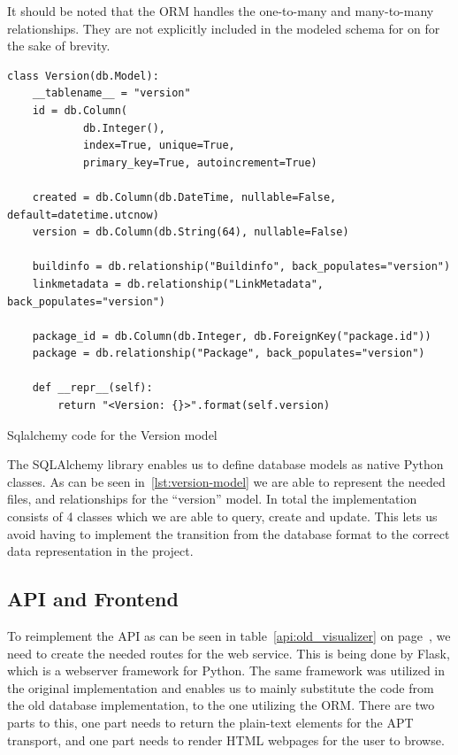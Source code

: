 \documentclass[../Main/thesis.tex]{subfiles}
\begin{document}
It should be noted that the ORM handles the one-to-many and many-to-many
relationships. They are not explicitly included in the modeled schema for on 
for the sake of brevity.

\begin{listing}[H]
\begin{verbatim}
class Version(db.Model):
    __tablename__ = "version"
    id = db.Column(
            db.Integer(),
            index=True, unique=True, 
            primary_key=True, autoincrement=True)

    created = db.Column(db.DateTime, nullable=False, default=datetime.utcnow)
    version = db.Column(db.String(64), nullable=False)

    buildinfo = db.relationship("Buildinfo", back_populates="version")
    linkmetadata = db.relationship("LinkMetadata", back_populates="version")

    package_id = db.Column(db.Integer, db.ForeignKey("package.id"))
    package = db.relationship("Package", back_populates="version")

    def __repr__(self):
        return "<Version: {}>".format(self.version)
\end{verbatim}
\caption{Sqlalchemy code for the Version model}
\label{lst:version-model}
\end{listing}

The SQLAlchemy library enables us to define database models as native Python
classes. As can be seen in~\ref{lst:version-model} we are able to represent the
needed files, and relationships for the ``version'' model. In total the
implementation consists of 4 classes which we are able to query, create and
update. This lets us avoid having to implement the transition from the database
format to the correct data representation in the project.

\subsection*{API and Frontend}%
\label{sub:api_and_frontend}

To reimplement the API as can be seen in table~\ref{api:old_visualizer} on
page~\pageref{api:old_visualizer}, we need to create the needed routes for the
web service. This is being done by Flask, which is a webserver framework for
Python. The same framework was utilized in the original implementation and
enables us to mainly substitute the code from the old database implementation,
to the one utilizing the ORM. There are two parts to this, one part needs to
return the plain-text elements for the APT transport, and one part needs to
render HTML webpages for the user to browse.
\end{document}
